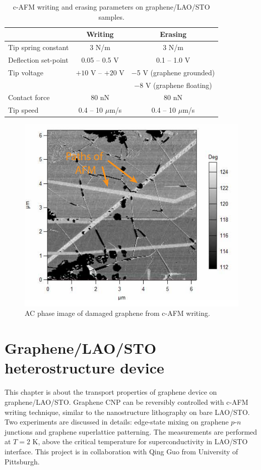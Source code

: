 \documentclass[pdflatex, sectionletters, 12pt, final, phd]{pittetd}    %
\begin{document}
\begin{table}[h!]
	\centering
	\vspace{0.85cm}
	\begin{tabular}{l|cc}
		\hline
		&    Writing    &    Erasing \\ \hline
		Tip spring constant    &    3 N/m    & 3 N/m    \\ 
		Deflection set-point    &    0.05 -- 0.5 V    &    0.1 -- 1.0 V    \\    
		Tip voltage    &    $+10$ V -- $+20$ V    & $-$5 V (graphene grounded) \\
		&    & $-$8 V (graphene floating) \\
		Contact force    &    80 nN    &    80 nN    \\
		Tip speed    &    0.4 -- 10 $\mu$m/s    &    0.4 -- 10 $\mu$m/s \\ \hline 
	\end{tabular}
	\caption{c-AFM writing and erasing parameters on graphene/LAO/STO samples.}
	\label{TAB:GCOLithography}
\end{table}

\begin{figure}[h!]
	\centering
	\includegraphics[width=.7\textwidth]{Drawing/GrapheneDamages.pdf}
	\caption[AC phase image of damaged graphene from c-AFM writing]{AC phase image of damaged graphene from c-AFM writing.}
	\label{FIG:GrapheneDamages}
\end{figure}

\chapter{Graphene/LAO/STO heterostructure device}
\label{SEC:GCO}

This chapter is about the transport properties of graphene device on graphene/LAO/STO. Graphene CNP can be reversibly controlled with c-AFM writing technique, similar to the nanostructure lithography on bare LAO/STO. Two experiments are discussed in details: edge-state mixing on graphene $p$-$n$ junctions and graphene superlattice patterning. The measurements are performed at $T = 2$ K, above the critical temperature for superconductivity in LAO/STO interface. This project is in collaboration with Qing Guo from University of Pittsburgh.
\end{document}
